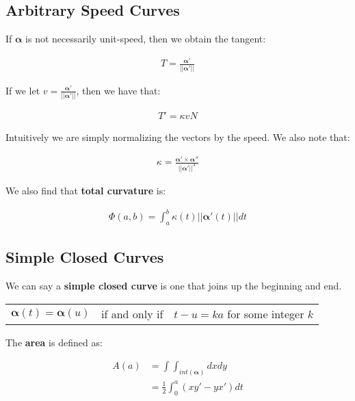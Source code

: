 \documentclass[11pt]{article}
\begin{document}
\subsection{Arbitrary Speed Curves}
\label{sec:orgef76a6a}
If \(\boldsymbol{\alpha}\) is not necessarily unit-speed, then we obtain the tangent:

\begin{align*}
    T = \frac{\boldsymbol{\alpha}'}{\lvert \lvert \boldsymbol{\alpha}' \lvert \lvert}
\end{align*}

If we let \(v = \frac{\boldsymbol{\alpha}'}{\lvert \lvert \boldsymbol{\alpha}' \lvert \lvert}\), then we have that:

\begin{align*}
    T' = \kappa v N
\end{align*}

Intuitively we are simply normalizing the vectors by the speed. We also note that:

\begin{align*}
    \kappa = \frac{\boldsymbol{\alpha}' \times \boldsymbol{\alpha}''}{\lvert \lvert \boldsymbol{\alpha}' \lvert \lvert^{3}}
\end{align*}

We also find that \textbf{total curvature} is:

\begin{align*}
    \Phi\left(a,b\right) = \int_{a}^{b} \kappa\left(t\right)\lvert\lvert\boldsymbol{\alpha}'\left(t\right)\lvert\lvert dt
\end{align*}

\subsection{Simple Closed Curves}
\label{sec:orga83cd4c}
We can say a \textbf{simple closed curve} is one that joins up the beginning and end.

\begin{center}
    \begin{tabular}{ c c c }
        $\boldsymbol{\alpha}\left(t\right) = \boldsymbol{\alpha}\left(u\right)$ & if and only if & $t - u = ka$ for some integer $k$
    \end{tabular}
\end{center}

The \textbf{area} is defined as:

\begin{align*}
    A\left(a\right) &= \int \int_{int\left(\boldsymbol{\alpha}\right)} dxdy \\
    &= \frac{1}{2} \int_{0}^{a} \left(xy' - yx'\right)dt
\end{align*}
\end{document}
